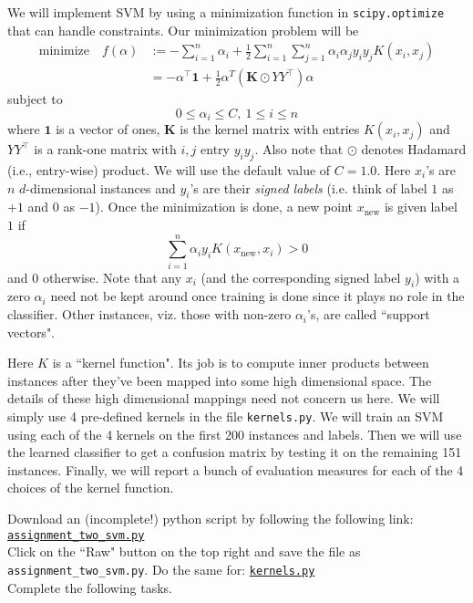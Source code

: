 \documentclass{article}
\begin{document}
We will implement SVM by using a minimization function in {\tt scipy.optimize} that can handle constraints. Our minimization problem will be
\begin{align*}
\text{minimize}\quad f(\alpha) &:= -\sum_{i=1}^n \alpha_i + \frac{1}{2} \sum_{i=1}^n \sum_{j=1}^n \alpha_i \alpha_j y_i y_j K(x_i, x_j) \\
&= -\alpha^\top \mathbf{1} + \frac{1}{2} \alpha^T (\mathbf{K} \odot YY^\top) \alpha
\end{align*}
subject to
$$
0 \leq \alpha_i \leq C,\ 1 \leq i \leq n
$$
where $\mathbf{1}$ is a vector of ones, $\mathbf{K}$ is the kernel matrix with entries $K(x_i, x_j)$ and $YY^\top$ is a rank-one matrix with $i, j$ entry $y_i y_j$. 
Also note that $\odot$ denotes Hadamard (i.e., entry-wise) product.
We will use the default value of $C=1.0$. Here $x_i$'s are $n$ $d$-dimensional instances and $y_i$'s are their \emph{signed labels} (i.e.
think of label $1$ as $+1$ and $0$ as $-1$). Once the minimization is done, a new point $x_{\text{new}}$ is given label $1$ if
\begin{equation}\label{eq:rule}
\sum_{i=1}^n \alpha_i y_i K(x_{\text{new}}, x_i) > 0
\end{equation}
and $0$ otherwise. Note that any $x_i$ (and the corresponding signed label $y_i$) with a zero $\alpha_i$ need not be kept around once training is done since it plays no role in the classifier.
Other instances, viz. those with non-zero $\alpha_i$'s, are called ``support vectors".

Here $K$ is a ``kernel function". Its job is to compute inner products between instances after they've been mapped into some high dimensional space.
The details of these high dimensional mappings need not concern us here. We will simply use 4 pre-defined kernels in the file {\tt kernels.py}.
We will train an SVM using each of the 4 kernels on the first 200 instances and labels. Then we will use the learned classifier
to get a confusion matrix by testing it on the remaining 151 instances. Finally, we will report a bunch of evaluation measures for each
of the 4 choices of the kernel function.

Download an (incomplete!) python script by following the following
link:\\
\href{https://github.com/ambujtewari/stats607a-fall2015/blob/master/homeworks/assignment_two_svm.py}{\tt assignment\_two\_svm.py} \\
Click on the ``Raw" button on the top right and save the file as {\tt assignment\_two\_svm.py}.
Do the same for:
\href{https://github.com/ambujtewari/stats607a-fall2015/blob/master/homeworks/kernels.py}{\tt kernels.py} \\
Complete the following tasks.
\end{document}
